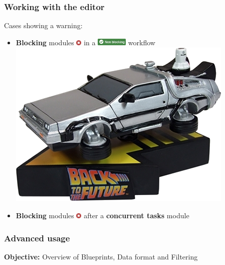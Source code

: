 \begin{frame}
    \frametitle{Working with the editor}
    Cases showing a warning:
    \begin{itemize}
        \item \textbf{Blocking} modules \includegraphics[width=10px]{pictures/blocking-module.png} in a \includegraphics[valign=b,width=56px]{pictures/non-blocking-workflow.png} workflow \includegraphics[width=0.12\linewidth]{pictures/time-machine.png}
        \item \textbf{Blocking} modules \includegraphics[width=10px]{pictures/blocking-module.png} after a \textbf{concurrent tasks} module
        \begin{center}
        \end{center}
    \end{itemize}
\end{frame}

\begin{frame}
    \frametitle{
        \huge
        \linebreak
        \linebreak
        \linebreak
        Advanced usage
        \vspace{1em}
    }
    \textbf{Objective:} Overview of Blueprints, Data format and Filtering
\end{frame}

